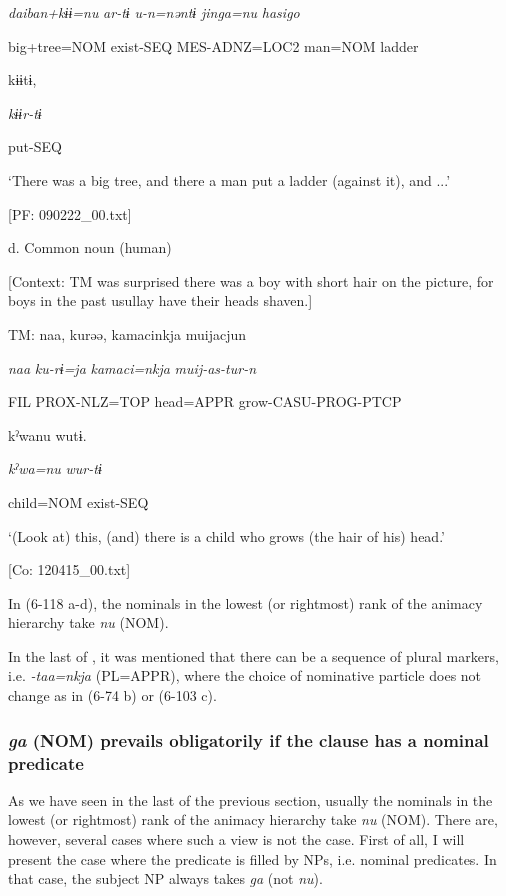       \textit{daiban+kɨɨ=nu}  \textit{ar-tɨ}  \textit{u-n=nəntɨ}  \textit{jinga=nu}  \textit{hasigo}

      big+tree=NOM  exist-SEQ  MES-ADNZ=LOC2  man=NOM  ladder

      kɨɨtɨ,

      \textit{kɨɨr-tɨ}

      put-SEQ

      ‘There was a big tree, and there a man put a ladder (against it), and ...’

      [PF: 090222\_00.txt]

  d.  Common noun (human)

    [Context: TM was surprised there was a boy with short hair on the picture, for boys in the past usullay have their heads shaven.]

    TM:  naa,  kurəə,  kamacinkja  muijacjun

      \textit{naa}  \textit{ku-rɨ=ja}  \textit{kamaci=nkja}  \textit{muij-as-tur-n}

      FIL  PROX-NLZ=TOP  head=APPR  grow-CASU-PROG-PTCP

      kˀwanu  wutɨ.

      \textit{kˀwa=nu}  \textit{wur-tɨ}

      child=NOM  exist-SEQ

      ‘(Look at) this, (and) there is a child who grows (the hair of his) head.’

      [Co: 120415\_00.txt]

In (6-118 a-d), the nominals in the lowest (or rightmost) rank of the animacy hierarchy take \textit{nu} (NOM).

  In the last of , it was mentioned that there can be a sequence of plural markers, i.e. \textit{{}-taa=nkja} (PL=APPR), where the choice of nominative particle does not change as in (6-74 b) or (6-103 c).

\subsubsection{\textit{ga} (NOM) prevails obligatorily if the clause has a nominal predicate}

As we have seen in the last of the previous section, usually the nominals in the lowest (or rightmost) rank of the animacy hierarchy take \textit{nu} (NOM). There are, however, several cases where such a view is not the case. First of all, I will present the case where the predicate is filled by NPs, i.e. nominal predicates. In that case, the subject NP always takes \textit{ga} (not \textit{nu}).

